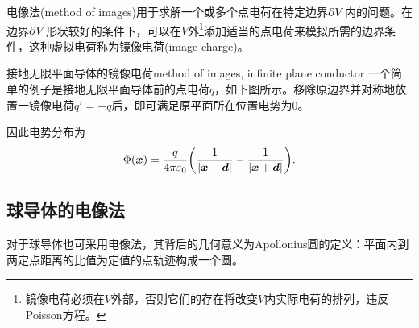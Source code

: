 电像法(method of images)用于求解一个或多个点电荷在特定边界$\partial V$内的问题。在边界$\partial V$形状较好的条件下，可以在$V$外\footnote{镜像电荷必须在$V$外部，否则它们的存在将改变$V$内实际电荷的排列，违反Poisson方程。}添加适当的点电荷来模拟所需的边界条件，这种虚拟电荷称为镜像电荷(image charge)。
\begin{example}{接地无限平面导体的镜像电荷}{method of images, infinite plane conductor}
    一个简单的例子是接地无限平面导体前的点电荷$q$，如下图所示。移除原边界并对称地放置一镜像电荷$q'=-q$后，即可满足原平面所在位置电势为0。
    \begin{center}
        \qquad
        \label{fig:image charge of plane}
    \end{center}
    因此电势分布为
    \begin{equation}
        \Phi(\bm x)=\frac q{4\pi\varepsilon_0}\biggl(\frac1{\left\lvert\bm x-\bm d\right\rvert}-\frac1{\left\lvert\bm x+\bm d\right\rvert}\biggr).
    \end{equation}
\end{example}

\subsection{球导体的电像法}
\label{ssec:method of images, sphere}

对于球导体也可采用电像法，其背后的几何意义为Apollonius圆的定义：平面内到两定点距离的比值为定值的点轨迹构成一个圆。%

